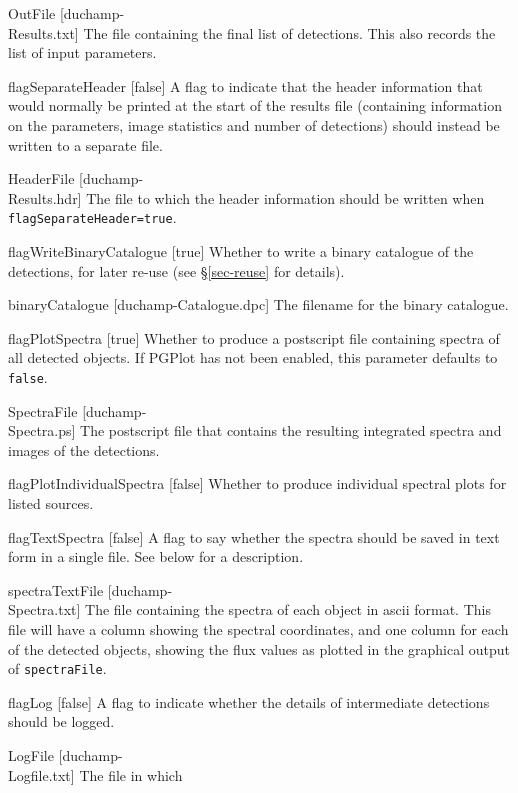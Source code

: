 \begin{Lentry}
\item[{OutFile [duchamp-\\Results.txt]}] The file containing the
  final list of detections. This also records the list of input
  parameters.
\item[{flagSeparateHeader [false]}] A flag to indicate that the header
  information that would normally be printed at the start of the
  results file (containing information on the parameters, image
  statistics and number of detections) should instead be written to a
  separate file.
\item[{HeaderFile [duchamp-\\Results.hdr]}] The file to which the
  header information should be written when
  \texttt{flagSeparateHeader=true}.
\item[{flagWriteBinaryCatalogue [true]}] Whether to write a binary
  catalogue of the detections, for later re-use (see
  \S\ref{sec-reuse} for details).
\item[{binaryCatalogue [duchamp-Catalogue.dpc]}] The filename for the
  binary catalogue.
\item[{flagPlotSpectra [true]}] Whether to produce a postscript file
  containing spectra of all detected objects. If PGPlot has not been
  enabled, this parameter defaults to \texttt{false}.
\item[{SpectraFile [duchamp-\\Spectra.ps]}] The postscript file
  that contains the resulting integrated spectra and images of the
  detections.
\item[{flagPlotIndividualSpectra [false]}] Whether to produce
  individual spectral plots for listed sources.
\item[{flagTextSpectra [false]}] A flag to say whether the spectra
  should be saved in text form in a single file. See below for a
  description. 
\item[{spectraTextFile [duchamp-\\Spectra.txt]}] The file containing
  the spectra of each object in ascii format. This file will have a
  column showing the spectral coordinates, and one column for each of
  the detected objects, showing the flux values as plotted in the
  graphical output of \texttt{spectraFile}.
\item[{flagLog [false]}] A flag to indicate whether the
  details of intermediate detections should be logged.
\item[{LogFile [duchamp-\\Logfile.txt]}] The file in which

\end{Lentry}
